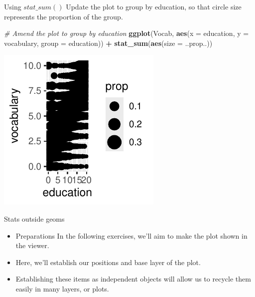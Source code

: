 \documentclass[
  ignorenonframetext,
]{beamer}
\newenvironment{Shaded}{\begin{snugshade}}{\end{snugshade}}
\newcommand{\AttributeTok}[1]{\textcolor[rgb]{0.13,0.29,0.53}{#1}}
\newcommand{\CommentTok}[1]{\textcolor[rgb]{0.56,0.35,0.01}{\textit{#1}}}
\newcommand{\FunctionTok}[1]{\textcolor[rgb]{0.13,0.29,0.53}{\textbf{#1}}}
\newcommand{\NormalTok}[1]{#1}
\newcommand{\SpecialCharTok}[1]{\textcolor[rgb]{0.81,0.36,0.00}{\textbf{#1}}}
\begin{document}
\begin{frame}[fragile]{Using \(stat\_sum()\)}
\label{using-stat_sum-7}
Update the plot to group by education, so that circle size represents
the proportion of the group.


\begin{Shaded}
\begin{Highlighting}[]
\CommentTok{\# Amend the plot to group by education}
\FunctionTok{ggplot}\NormalTok{(Vocab, }\FunctionTok{aes}\NormalTok{(}\AttributeTok{x =}\NormalTok{ education, }\AttributeTok{y =}\NormalTok{ vocabulary, }\AttributeTok{group =}\NormalTok{ education)) }\SpecialCharTok{+}
    \FunctionTok{stat\_sum}\NormalTok{(}\FunctionTok{aes}\NormalTok{(}\AttributeTok{size =}\NormalTok{ ..prop..))}
\end{Highlighting}
\end{Shaded}

\begin{center}\includegraphics[width=0.5\linewidth]{Figs/unnamed-chunk-24-1} \end{center}
\end{frame}

\begin{frame}{Stats outside geoms}
\label{stats-outside-geoms}
\begin{itemize}
\item
  Preparations In the following exercises, we'll aim to make the plot
  shown in the viewer.
\item
  Here, we'll establish our positions and base layer of the plot.
\item
  Establishing these items as independent objects will allow us to
  recycle them easily in many layers, or plots.
\end{itemize}
\end{frame}
\end{document}
